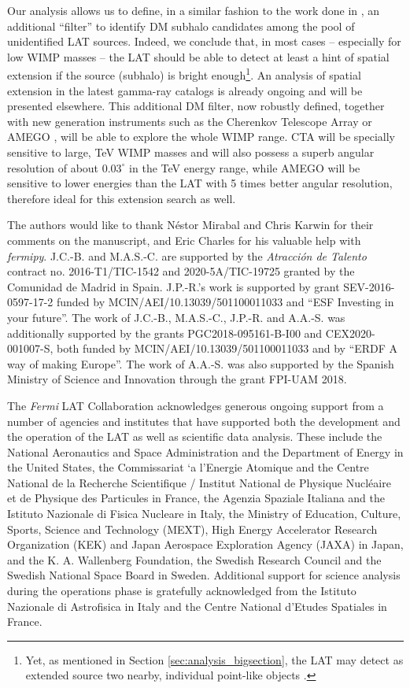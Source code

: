 \documentclass[%
 reprint,
nofootinbib,
 amsmath,amssymb,
 aps,
]{revtex4-2}
\begin{document}
Our analysis allows us to define, in a similar fashion to the work done in , an additional ``filter'' to identify DM subhalo candidates among the pool of unidentified LAT sources. Indeed, we conclude that, in most cases -- especially for low WIMP masses -- the LAT should be able to detect at least a hint of spatial extension if the source (subhalo) is bright enough\footnote{Yet, as mentioned in Section \ref{sec:analysis_bigsection}, the LAT may detect as extended source two nearby, individual point-like objects \cite{2018PDU....21....1C}.}. An analysis of spatial extension in the latest gamma-ray catalogs is already ongoing and will be presented elsewhere. This additional DM filter, now robustly defined, together with new generation instruments such as the Cherenkov Telescope Array \cite{coronadoblazquez2021sensitivity} or AMEGO \cite{mcenery2019allsky}, will be able to explore the whole WIMP range. CTA will be specially sensitive to large, TeV WIMP masses and will also possess a superb angular resolution of about $0.03^\circ$ in the TeV energy range, while AMEGO will be sensitive to lower energies than the LAT with 5 times better angular resolution, therefore ideal for this extension search as well.


\acknowledgments

The authors would like to thank N\'estor Mirabal and Chris Karwin for their comments on the manuscript, and Eric Charles for his valuable help with \textit{fermipy}. J.C.-B. and M.A.S.-C. are supported by the {\it Atracci\'on de Talento} contract no. 2016-T1/TIC-1542 and 2020-5A/TIC-19725 granted by the Comunidad de Madrid in Spain. {  J.P.-R.'s work is supported by grant SEV-2016-0597-17-2 funded by MCIN/AEI/10.13039/501100011033 and ``ESF Investing in your future''. The work of J.C.-B., M.A.S.-C., J.P.-R. and A.A.-S. was additionally supported by the grants PGC2018-095161-B-I00 and CEX2020-001007-S, both funded by MCIN/AEI/10.13039/501100011033 and by ``ERDF A way of making Europe''. }The work of A.A.-S. was also supported by the Spanish Ministry of Science and Innovation through the grant FPI-UAM 2018.

The \textit{Fermi} LAT Collaboration acknowledges generous ongoing support from a number of agencies and institutes that have supported both the development and the operation of the LAT as well as scientific data analysis. These include the National Aeronautics and Space Administration and the Department of Energy in the United States, the Commissariat `a l’Energie Atomique and the Centre National de la Recherche Scientifique / Institut National de Physique Nucl\'eaire et de Physique des Particules in France, the Agenzia Spaziale Italiana and the Istituto Nazionale di Fisica Nucleare in Italy, the Ministry of Education, Culture, Sports, Science and Technology (MEXT), High Energy Accelerator Research Organization (KEK) and Japan Aerospace Exploration Agency (JAXA) in Japan, and the K. A. Wallenberg Foundation, the Swedish Research Council and the Swedish National Space Board in Sweden. Additional support for science analysis during the operations phase is gratefully acknowledged from the Istituto Nazionale di Astrofisica in Italy and the Centre National d'Etudes Spatiales in France.
\end{document}
